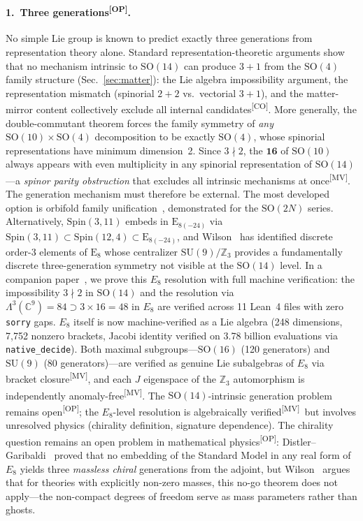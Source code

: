 \documentclass[aps,prd,twocolumn,showpacs,preprintnumbers,superscriptaddress,floatfix]{revtex4-2}
\newcommand{\MV}{\textsuperscript{[MV]}}
\newcommand{\CO}{\textsuperscript{[CO]}}
\newcommand{\OP}{\textsuperscript{[OP]}}
\begin{document}
\paragraph{1.\ Three generations\OP.}
No simple Lie group is known to predict exactly three generations
from representation theory alone.  Standard representation-theoretic arguments show that no mechanism
intrinsic to $\mathrm{SO}(14)$ can produce $3+1$ from the $\mathrm{SO}(4)$
family structure (Sec.~\ref{sec:matter}): the Lie algebra impossibility
argument, the representation mismatch (spinorial $2+2$ vs.\ vectorial $3+1$),
and the matter-mirror content collectively exclude all internal candidates\CO.
More generally, the double-commutant theorem forces the family
symmetry of \emph{any} $\mathrm{SO}(10) \times \mathrm{SO}(4)$
decomposition to be exactly $\mathrm{SO}(4)$, whose spinorial
representations have minimum dimension~2.  Since $3 \nmid 2$, the
$\mathbf{16}$ of $\mathrm{SO}(10)$ always appears with even
multiplicity in any spinorial representation of $\mathrm{SO}(14)$---a
\emph{spinor parity obstruction} that excludes all intrinsic
mechanisms at once\MV.  The generation mechanism must therefore be
external.  The most developed option is orbifold family
unification~\cite{kawamura2010}, demonstrated for the
$\mathrm{SO}(2N)$ series.  Alternatively, $\mathrm{Spin}(3,11)$
embeds in $\mathrm{E}_{8(-24)}$ via
$\mathrm{Spin}(3,11) \subset \mathrm{Spin}(12,4) \subset
\mathrm{E}_{8(-24)}$, and Wilson~\cite{wilson2024} has identified
discrete order-3 elements of $\mathrm{E}_8$ whose centralizer
$\mathrm{SU}(9)/\mathbb{Z}_3$ provides a fundamentally discrete
three-generation symmetry not visible at the $\mathrm{SO}(14)$ level.
In a companion paper~\cite{arnoldy2026prl}, we prove this $E_8$
resolution with full machine verification: the impossibility
$3 \nmid 2$ in $\mathrm{SO}(14)$ and the resolution via
$\Lambda^3(\mathbb{C}^9) = 84 \supset 3 \times 16 = 48$ in $E_8$
are verified across 11 Lean~4 files with zero \texttt{sorry} gaps.
$E_8$ itself is now machine-verified as a Lie algebra
(248 dimensions, 7,752 nonzero brackets, Jacobi identity verified
on 3.78 billion evaluations via \texttt{native\_decide}).
Both maximal subgroups---$\mathrm{SO}(16)$ (120 generators) and
$\mathrm{SU}(9)$ (80 generators)---are verified as genuine Lie
subalgebras of $E_8$ via bracket closure\MV, and
each $J$ eigenspace of the $\mathbb{Z}_3$ automorphism is
independently anomaly-free\MV.
The $\mathrm{SO}(14)$-intrinsic generation problem remains open\OP;
the $E_8$-level resolution is algebraically verified\MV\ but involves
unresolved physics (chirality definition, signature dependence).
The chirality question remains an open problem in mathematical
physics\OP: Distler--Garibaldi~\cite{distler2010} proved that no
embedding of the Standard Model in any real form of $E_8$ yields
three \emph{massless chiral} generations from the adjoint, but
Wilson~\cite{wilson2022} argues that for theories with explicitly
non-zero masses, this no-go theorem does not apply---the non-compact
degrees of freedom serve as mass parameters rather than ghosts.
\end{document}
